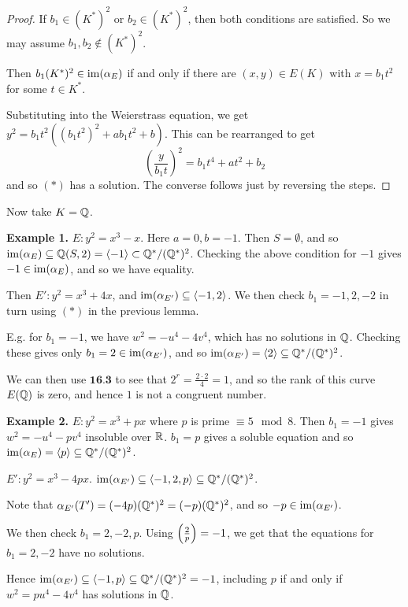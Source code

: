 \documentclass[10pt,a4paper]{article}
\begin{document}
\begin{proof}
  If $b_1 \in (K^\ast)^2$ or $b_2 \in (K^\ast)^2$, then both conditions are satisfied. So we may assume $b_1, b_2 \notin (K^\ast)^2$.

  Then $b_1(K^\ast)^2 \in \operatorname{im}(\alpha_E)$ if and only if there are $(x,y) \in E(K)$ with $x = b_1t^2$ for some $t \in K^\ast$.

  Substituting into the Weierstrass equation, we get $y^2 = b_1t^2((b_1t^2)^2 + ab_1t^2 + b)$. This can be rearranged to get
  \[\left(\frac{y}{b_1t}\right)^2 = b_1t^4 + at^2 + b_2\]
  and so $(\ast)$ has a solution. The converse follows just by reversing the steps.
\end{proof}
Now take $K = \mathbb{Q}$.

\textbf{Example 1.} $E: y^2 = x^3-x$. Here $a = 0, b = -1$. Then $S = \emptyset$, and so $\operatorname{im}(\alpha_E) \subseteq \mathbb{Q}(S,2) = \langle -1 \rangle \subset \mathbb{Q}^\ast/(\mathbb{Q}^\ast)^2$. Checking the above condition for $-1$ gives $-1 \in \operatorname{im}(\alpha_E)$, and so we have equality.

Then $E': y^2 = x^3+4x$, and $\operatorname{im}(\alpha_{E'}) \subseteq \langle -1,2 \rangle$. We then check $b_1 = -1, 2, -2$ in turn using $(\ast)$ in the previous lemma.

E.g. for $b_1 = -1$, we have $w^2 = -u^4-4v^4$, which has no solutions in $\mathbb{Q}$. Checking these gives only $b_1 = 2 \in \operatorname{im}(\alpha_{E'})$, and so $\operatorname{im}(\alpha_{E'}) = \langle 2 \rangle \subseteq \mathbb{Q}^\ast/(\mathbb{Q}^\ast)^2$.

We can then use $\textbf{16.3}$ to see that $2^r = \frac{2\cdot 2}{4} = 1$, and so the rank of this curve $E(\mathbb{Q})$ is zero, and hence $1$ is not a congruent number.

\textbf{Example 2.} $E: y^2 = x^3 + px$ where $p$ is prime $\equiv 5 \mod 8$. Then $b_1 = -1$ gives $w^2 = -u^4-pv^4$ insoluble over $\mathbb{R}$. $b_1 = p$ gives a soluble equation and so $\operatorname{im}(\alpha_E) = \langle p \rangle \subseteq \mathbb{Q}^\ast/(\mathbb{Q}^\ast)^2$.

$E': y^2 = x^3-4px$. $\operatorname{im}(\alpha_{E'}) \subseteq \langle -1,2,p \rangle\subseteq \mathbb{Q}^\ast/(\mathbb{Q}^\ast)^2$.

Note that $\alpha_{E'}(T') = (-4p)(\mathbb{Q}^\ast)^2 = (-p)(\mathbb{Q}^\ast)^2$, and so $-p \in \operatorname{im}(\alpha_{E'})$.

We then check $b_1 = 2, -2, p$. Using $\left(\frac{2}{p}\right) = -1$, we get that the equations for $b_1 = 2, -2$ have no solutions.

Hence $\operatorname{im}(\alpha_{E'}) \subseteq \langle -1,p \rangle\subseteq \mathbb{Q}^\ast/(\mathbb{Q}^\ast)^2 = -1$, including $p$ if and only if $w^2 = pu^4-4v^4$ has solutions in $\mathbb{Q}$.
\end{document}
